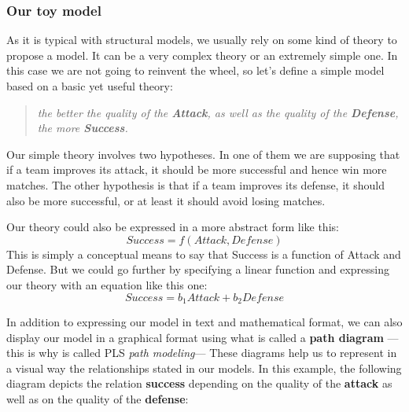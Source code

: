 \documentclass[12pt]{book}\usepackage{graphicx, color}
\begin{document}
\subsubsection*{Our toy model}
As it is typical with structural models, we usually rely on some kind of theory to propose a model. It can be a very complex theory or an extremely simple one. In this case we are not going to reinvent the wheel, so let's define a simple model based on a basic yet useful theory:

\vspace{2mm}
\begin{quotation} \noindent
\textit{the better the quality of the \textbf{Attack}, as well as the quality of the \textbf{Defense}, \\ the more \textbf{Success}.}
\end{quotation}

\vspace{2mm}
Our simple theory involves two hypotheses. In one of them we are supposing that if a team improves its attack, it should be more successful and hence win more matches. The other hypothesis is that if a team improves its defense, it should also be more successful, or at least it should avoid losing matches.

Our theory could also be expressed in a more abstract form like this:
$$ Success = f(Attack, Defense) $$
This is simply a conceptual means to say that Success is a function of Attack and Defense. But we could go further by specifying a linear function and expressing our theory with an equation like this one:
$$ Success = b_1 Attack + b_2 Defense $$

In addition to expressing our model in text and mathematical format, we can also display our model in a graphical format using what is called a \textbf{path diagram} ---this is why is called PLS \textit{path modeling}--- These diagrams help us to represent in a visual way the relationships stated in our models. In this example, the following diagram depicts the relation \textbf{success} depending on the quality of the \textbf{attack} as well as on the quality of the \textbf{defense}:
\end{document}
